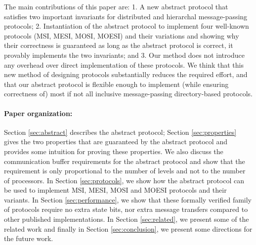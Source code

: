 The main contributions of this paper are: 1. A new abstract protocol that
satisfies two important invariants for distributed and hierarchal
message-passing protocols; 2. Instantiation of the abstract protocol to
implement four well-known protocols (MSI, MESI, MOSI, MOESI) and their
variations and showing why their correctness is guaranteed as long as the
abstract protocol is correct, \ie it provably implements the two invariants;
and 3. Our method does not introduce any overhead over direct implementation of
these protocols.  We think that this new method of designing protocols
substantially reduces the required effort, and that our abstract protocol is
flexible enough to implement (while ensuring correctness of) most if not all
inclusive message-passing directory-based protocols.

\paragraph{Paper organization:} Section \ref{sec:abstract} describes the abstract
protocol; Section \ref{sec:properties} gives the two properties that are
guaranteed by the abstract protocol and provides some intuition for proving
these properties. We also discuss the communication buffer requirements for the
abstract protocol and show that the requirement is only proportional to the
number of levels and not to the number of processors. In Section
\ref{sec:protocols}, we show how the abstract protocol can be used to implement
MSI, MESI, MOSI and MOESI protocols and their variants. In Section
\ref{sec:performance}, we show that these formally verified family of protocols
require no extra state bits, nor extra message transfers compared to other
published implementations. In Section \ref{sec:related}, we present some of the
related work and finally in Section \ref{sec:conclusion}, we present some
directions for the future work.
